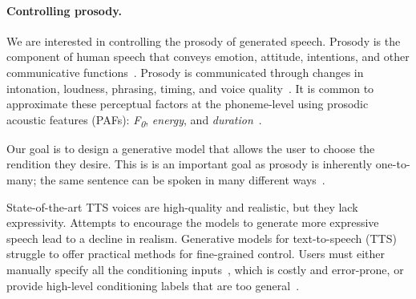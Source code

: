 \documentclass[a4paper,12pt,twoside,openright]{article}
\newcommand{\fzero}{F\textsubscript{0}}
\begin{document}
\paragraph{Controlling prosody.} %
We are interested in controlling the prosody of generated speech. Prosody is the component of human speech that conveys emotion, attitude, intentions, and other communicative functions~\parencite[Chapter~2]{zack-PhD-thesis:2022}. Prosody is communicated through changes in intonation, loudness, phrasing, timing, and voice quality~\parencite{prosody-review:2010}. It is common to approximate these perceptual factors at the phoneme-level using prosodic acoustic features (PAFs): \textit{\fzero}, \textit{energy}, and \textit{duration}~\parencite{PaperCup-Ctrl-P:2021}. 

Our goal is to design a generative model that allows the user to choose the rendition they desire. This is is an important goal as prosody is inherently one-to-many; the same sentence can be spoken in many different ways~\parencite{prosody-review:2010}.

State-of-the-art TTS voices are high-quality and realistic, but they lack expressivity. Attempts to encourage the models to generate more expressive speech lead to a decline in realism. Generative models for text-to-speech (TTS) struggle to offer practical methods for fine-grained control. Users must either manually specify all the conditioning inputs~\parencite{Lee2018RobustAF, vetterli}, which is costly and error-prone, or provide high-level conditioning labels that are too general~\parencite{Ramesh2022HierarchicalTI}.

\end{document}

